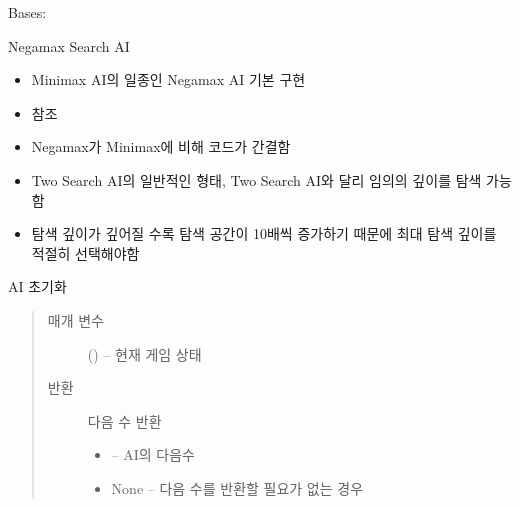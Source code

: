 \documentclass[letterpaper,10pt,english]{sphinxmanual}
\begin{document}
\begin{fulllineitems}
\label{\detokenize{agents.search:agents.search.negamax_search_agent.NegamaxSearchAgent}}
Bases: {\hyperref[\detokenize{agents:agents.BaseAgent}]{}}

Negamax Search AI
\begin{itemize}
\item {} 
Minimax AI의 일종인 Negamax AI 기본 구현

\item {} 
 참조

\item {} 
Negamax가 Minimax에 비해 코드가 간결함

\item {} 
Two Search AI의 일반적인 형태, Two Search AI와 달리 임의의 깊이를 탐색 가능함

\item {} 
탐색 깊이가 깊어질 수록 탐색 공간이 10배씩 증가하기 때문에 최대 탐색 깊이를 적절히 선택해야함

\end{itemize}

\begin{fulllineitems}
\label{\detokenize{agents.search:agents.search.negamax_search_agent.NegamaxSearchAgent.act}}
AI 초기화
\begin{quote}\begin{description}
\item[{매개 변수}] \leavevmode
{} ({\hyperref[\detokenize{scripts:scripts.run_game.State}]{}}) -- 현재 게임 상태

\item[{반환}] \leavevmode

다음 수 반환
\begin{itemize}
\item {} 
 -- AI의 다음수

\item {} 
None -- 다음 수를 반환할 필요가 없는 경우


\end{itemize}
\end{description}
\end{quote}
\end{fulllineitems}
\end{fulllineitems}
\end{document}
